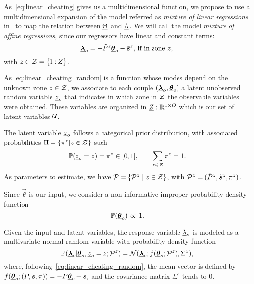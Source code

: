 \documentclass{ifacconf}  %
\begin{document}
As~\eqref{eq:linear_cheating} gives us a multidimensional \pwa{} function, we propose to use a multidimensional expansion of the model referred as \emph{mixture of linear regressions} in~\cite{FariaSoromenho2010} to map the relation between $\underline{\Theta}$ and $\underline{\Lambda}$. We will call the model \emph{mixture of affine regressions}, since our regressors have linear and constant terms:
\begin{equation}\label{eq:linear_cheating_random}
  {\underline{\boldsymbol{\lambda}}}_{o}=
    -\tilde{P}^{z}{\underline{\boldsymbol{\theta}}}_{o}-\tilde{\boldsymbol{s}}^{z}\text{, if in zone } z,\\
\end{equation}
with  ${z\in\mathcal{Z}=\{1\mathbin{:}Z\}}$.

As \eqref{eq:linear_cheating_random} is a \pwa{} function whose modes depend on the unknown zone ${z\in\mathcal{Z}}$,
we associate to each couple $(    {\underline{\boldsymbol{\lambda}}}_{o}, {\underline{\boldsymbol{\theta}}}_{o})$ a latent unobserved random variable ${\underline{z}_{o}}$ that indicates in which zone in $\mathcal{Z}$ the observable variables were obtained.
These variables are organized in ${\underline{Z}:\mathbb{R}^{1\times O}}$ which is our set of latent variables $\mathcal{U}$.

The latent variable $\underline{z}_{o}$ follows a categorical prior distribution, with associated probabilities ${\Pi=\{\pi^{z}|z\in\mathcal{Z}\}}$ such
\[\mathbb{P}(\underline{z}_{o}=z)=\pi^{z} \in [0,1], \qquad \sum_{z\in\mathcal{Z}} \pi^{z} = 1.
\]
As parameters to estimate, we have ${\mathcal{P}=\{\mathcal{P}^{z}\mid z\in\mathcal{Z}\}}$, with ${\mathcal{P}^{z}=(\tilde{P}^{z},\tilde{\boldsymbol{s}}^{z},\pi^{z})}$.

Since $\vec{\theta}$ is our input, we consider a non-informative improper probability density function~\citep{ChristensenEtAl2010}
\[
  \mathbb{P}({\underline{\boldsymbol{\theta}}}_{o}) \,\propto \,1.
\]

Given the input and latent variables, the response variable $\underline{\lambda}_{o}$ is modeled as a multivariate normal random variable with probability density function
\begin{equation}
  \label{eq:multivariate_gaussian}
\mathbb{P}({\underline{\boldsymbol{\lambda}}}_{o}|{\underline{\boldsymbol{\theta}}}_{o},\underline{z}_{o}=z; \mathcal{P}^{z}) = \mathcal{N}({\underline{\boldsymbol{\lambda}}}_{o};f({\underline{\boldsymbol{\theta}}}_{o};\mathcal{P}^{z}),{\Sigma^{z}}),
\end{equation}
where, following~\eqref{eq:linear_cheating_random}, the mean vector is defined by
\({f({\underline{\boldsymbol{\theta}}}_{o};(P,\boldsymbol{s},\pi))=-{P}{\underline{\boldsymbol{\theta}}}_{o}-{\boldsymbol{s}},}\)
and the covariance matrix ${\Sigma^{z}}$ tends to $0$.
\end{document}
